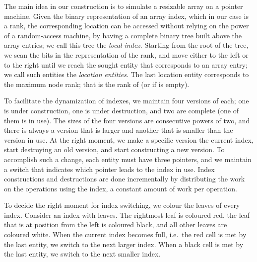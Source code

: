 \documentclass{llncs}
\begin{document}
The main idea in our construction is to simulate a resizable array on
a pointer machine.  Given the binary representation of an array index,
which in our case is a rank, the corresponding location can be
accessed without relying on the power of a random-access machine, by
having a complete binary tree built above the array entries;
we call this tree the \emph{local index}. 
Starting from the root of the tree, we scan the bits in the representation of
the rank, and move either to the left or to the right until we reach
the sought entity that corresponds to an array entry; 
we call such entities the \emph{location entities}.   
The last location entity corresponds to the maximum node rank;
that is the rank of  (or  if  is empty).

To facilitate the dynamization of indexes, we maintain four versions of
each; one is under construction, one is under destruction, and two are
complete (one of them is in use).  The sizes of the four versions are
consecutive powers of two, and there is always a version that is
larger and another that is smaller than the version in use.  At the
right moment, we make a specific version the current index, start
destroying an old version, and start constructing a new version.  To
accomplish such a change, each entity must
have three pointers, and we maintain a switch that indicates which
pointer leads to the index in use.  Index constructions and
destructions are done incrementally by distributing the work on the
operations using the index, a constant amount of work per operation.

To decide the right moment for index switching, we colour the leaves of 
every index. Consider an index with  leaves. The rightmost leaf
is coloured red, the leaf that is at position  from the left is coloured black, 
and all other leaves are coloured white.  
When the current index becomes full, i.e.~the red cell is met
by the last entity, we switch to the next larger index. When a
black cell is met by the last entity, we switch to the next smaller index. 
\end{document}
